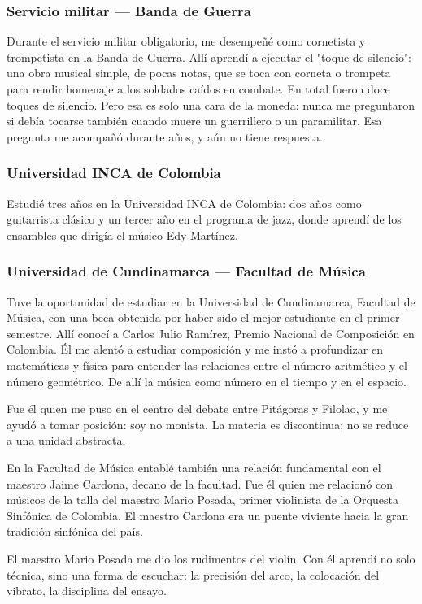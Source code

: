 \documentclass[14pt, a4paper]{article}
\begin{document}
\subsubsection{Servicio militar — Banda de Guerra}
\label{servicio-militar}
Durante el servicio militar obligatorio, me desempeñé como cornetista
y trompetista en la Banda de Guerra. Allí aprendí a ejecutar el "toque
de silencio": una obra musical simple, de pocas notas, que se toca con
corneta o trompeta para rendir homenaje a los soldados caídos en
combate. En total fueron doce toques de silencio. Pero esa es solo una
cara de la moneda: nunca me preguntaron si debía tocarse también
cuando muere un guerrillero o un paramilitar. Esa pregunta me acompañó
durante años, y aún no tiene respuesta.
\subsubsection{Universidad INCA de Colombia}
\label{universidad-inca}
Estudié tres años en la Universidad INCA de Colombia: dos años como
guitarrista clásico y un tercer año en el programa de jazz, donde
aprendí de los ensambles que dirigía el músico Edy Martínez.
\subsubsection{Universidad de Cundinamarca — Facultad de Música}
\label{universidad-cundinamarca}
Tuve la oportunidad de estudiar en la Universidad de Cundinamarca,
Facultad de Música, con una beca obtenida por haber sido el mejor
estudiante en el primer semestre. Allí conocí a Carlos Julio Ramírez,
Premio Nacional de Composición en Colombia. Él me alentó a estudiar
composición y me instó a profundizar en matemáticas y física para
entender las relaciones entre el número aritmético y el número
geométrico. De allí la música como número en el tiempo y en el espacio.

Fue él quien me puso en el centro del debate entre Pitágoras y
Filolao, y me ayudó a tomar posición: soy no monista. La materia es
discontinua; no se reduce a una unidad abstracta.

En la Facultad de Música entablé también una relación fundamental con
el maestro Jaime Cardona, decano de la facultad. Fue él quien me
relacionó con músicos de la talla del maestro Mario Posada, primer
violinista de la Orquesta Sinfónica de Colombia. El maestro Cardona
era un puente viviente hacia la gran tradición sinfónica del país.

El maestro Mario Posada me dio los rudimentos del violín. Con él
aprendí no solo técnica, sino una forma de escuchar: la precisión del
arco, la colocación del vibrato, la disciplina del ensayo.
\end{document}
